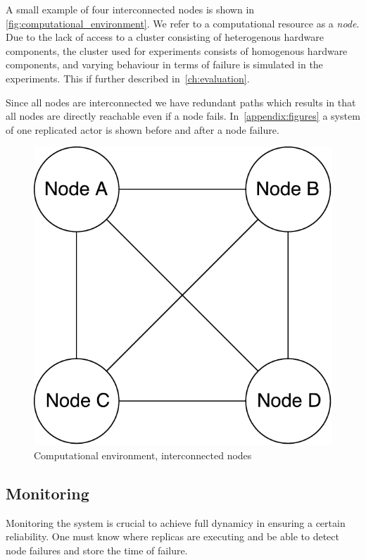 \documentclass{cslthse-msc}
\begin{document}
A small example of four interconnected nodes  is shown in \autoref{fig:computational_environment}. We refer to a computational resource as a \emph{node}. Due to the lack of access to a cluster consisting of heterogenous hardware components, the cluster used for experiments consists of homogenous hardware components, and varying behaviour in terms of failure is simulated in the experiments. This if further described in~\autoref{ch:evaluation}.

Since all nodes are interconnected we have redundant paths which results in that all nodes are directly reachable even if a node fails. In~\autoref{appendix:figures} a system of one replicated actor is shown before and after a node failure.

\begin{figure}[!hbt]
\centering
\includegraphics[scale=0.5]{images/computational_environment.pdf}
\caption{Computational environment, interconnected nodes} \label{fig:computational_environment}
\end{figure}

\subsection{Monitoring} \label{subsec:design_monitoring}
Monitoring the system is crucial to achieve full dynamicy in ensuring a certain reliability. One must know where replicas are executing and be able to detect node failures and store the time of failure.
\end{document}
